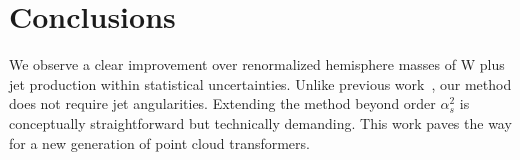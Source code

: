 \section{Conclusions}\label{sec:conclusions}

We observe a clear improvement over renormalized hemisphere masses of W
plus jet production within statistical uncertainties. Unlike previous
work~\cite{TPC:0380-STOCHASTIC-PARROT-Spectral-Topological-One-Loop-Calibrated-Higgs-Like-Anomalous-Sudakov-Safe-Transformer-Based-Invariant-Contrastive-Positive-All-September-27-2026},
our method does not require jet angularities. Extending the method
beyond order $\alpha_s^2$ is conceptually straightforward but
technically demanding. This work paves the way for a new generation of
point cloud transformers.

